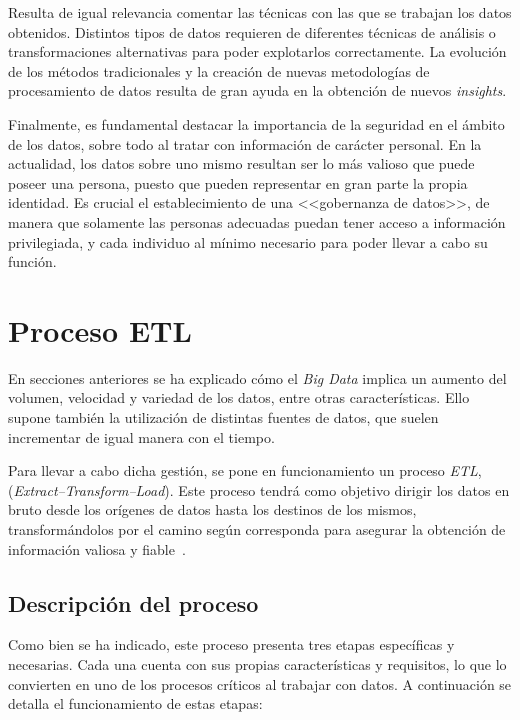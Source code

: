 Resulta de igual relevancia comentar las técnicas con las que se trabajan los datos obtenidos. Distintos tipos de datos requieren de diferentes técnicas de análisis o transformaciones alternativas para poder explotarlos correctamente. La evolución de los métodos tradicionales y la creación de nuevas metodologías de procesamiento de datos resulta de gran ayuda en la obtención de nuevos \textit{insights}.

Finalmente, es fundamental destacar la importancia de la seguridad en el ámbito de los datos, sobre todo al tratar con información de carácter personal. En la actualidad, los datos sobre uno mismo resultan ser lo más valioso que puede poseer una persona, puesto que pueden representar en gran parte la propia identidad. Es crucial el establecimiento de una <<gobernanza de datos>>, de manera que solamente las personas adecuadas puedan tener acceso a información privilegiada, y cada individuo al mínimo necesario para poder llevar a cabo su función.

\section{Proceso ETL}

En secciones anteriores se ha explicado cómo el \textit{Big Data} implica un aumento del volumen, velocidad y variedad de los datos, entre otras características. Ello supone también la utilización de distintas fuentes de datos, que suelen incrementar de igual manera con el tiempo.

Para llevar a cabo dicha gestión, se pone en funcionamiento un proceso \textit{ETL}, (\textit{Extract--Transform--Load}). Este proceso tendrá como objetivo dirigir los datos en bruto desde los orígenes de datos hasta los destinos de los mismos, transformándolos por el camino según corresponda para asegurar la obtención de información valiosa y fiable~\cite{databricksETL}.

\subsection{Descripción del proceso}

Como bien se ha indicado, este proceso presenta tres etapas específicas y necesarias. Cada una cuenta con sus propias características y requisitos, lo que lo convierten en uno de los procesos críticos al trabajar con datos. A continuación se detalla el funcionamiento de estas etapas:



